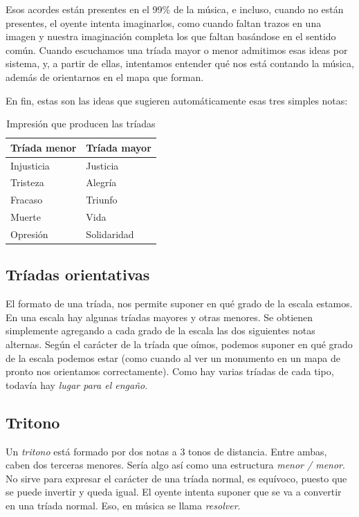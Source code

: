 \documentclass[]{report}
\begin{document}
Esos acordes están presentes en el 99\% de la música, e incluso, cuando no están presentes, el oyente intenta imaginarlos, como cuando faltan trazos en una imagen y nuestra imaginación completa los que faltan basándose en el sentido común. Cuando escuchamos una tríada mayor o menor admitimos esas ideas por sistema, y, a partir de ellas, intentamos entender qué nos está contando la música, además de orientarnos en el mapa que forman.

En fin, estas son las ideas que sugieren automáticamente esas tres simples notas:

\begin{table}[htbp]
	\centering
	\begin{tabular}{ll}
		\toprule
		\textbf{Tríada menor} & \textbf{Tríada mayor} \\
		\midrule
		Injusticia            & Justicia              \\
		Tristeza              & Alegría               \\
		Fracaso               & Triunfo               \\
		Muerte                & Vida                  \\
		Opresión              & Solidaridad           \\
		\bottomrule
	\end{tabular}
	\caption{Impresión que producen las tríadas}\label{tab:triad-impressions}
\end{table}

\subsection{Tríadas orientativas}

El formato de una tríada, nos permite suponer en qué grado de la escala estamos. En una escala hay algunas tríadas mayores y otras menores. Se obtienen simplemente agregando a cada grado de la escala las dos siguientes notas alternas. Según el carácter de la tríada que oímos, podemos suponer en qué grado de la escala podemos estar (como cuando al ver un monumento en un mapa de pronto nos orientamos correctamente). Como hay varias tríadas de cada tipo, todavía hay \emph{lugar para el engaño}.

\subsection{Tritono}

Un \emph{tritono} está formado por dos notas a 3 tonos de distancia. Entre ambas, caben dos terceras menores. Sería algo así como una estructura \emph{menor / menor}. No sirve para expresar el carácter de una tríada normal, es equívoco, puesto que se puede invertir y queda igual. El oyente intenta suponer que se va a convertir en una tríada normal. Eso, en música se llama \emph{resolver}.
\end{document}

